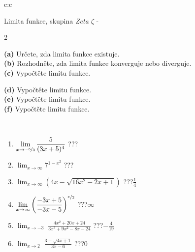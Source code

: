 \documentclass[10pt]{report}
\begin{document}
\newpage
\thispagestyle{empty}
\begin{tabular}{c:c}
\begin{minipage}[c][104.5mm][t]{0.5\linewidth}
\begin{center}
\vspace{7mm}
{\huge Limita funkce, skupina \textit{Zeta $\zeta$} -}\\[5mm]
\begin{minipage}{0.95\linewidth}
\begin{center}
{\small \begin{multicols}{2} \raggedright
\textbf{(a)} Určete, zda limita funkce existuje. \\[1mm]
\textbf{(b)} Rozhodněte, zda limita funkce konverguje nebo diverguje. \\[1mm]
\textbf{(c)} Vypočtěte limitu funkce. \par \columnbreak
\textbf{(d)} Vypočtěte limitu funkce. \\[1mm]
\textbf{(e)} Vypočtěte limitu funkce. \\[1mm]
\textbf{(f)} Vypočtěte limitu funkce. \\[1mm]
\end{multicols}
}
\end{center}
\end{minipage}
\\[4mm]
\begin{minipage}{0.79\linewidth}
\begin{center}
\begin{varwidth}{\linewidth}
\begin{enumerate}
\normalsize
\item $\displaystyle\lim_{x\to\nicefrac{-5}{3}}{\frac{5}{(3x+5)^{4}}}$\quad \dotfill\; ???\;\dotfill \quad {}
\item $\displaystyle\lim_{x\to\infty}{7^{1-x^2}}$\quad \dotfill\; ???\;\dotfill \quad {}
\item $\displaystyle\lim_{x\to\infty}{\left(4x - \sqrt{16x^2-2x+1}\right)}$\quad \dotfill\; ???\;\dotfill \quad $\frac{1}{4}$
\item $\displaystyle\lim_{x\to\infty}{\left( \frac{-3x+5}{-3x-5} \right)^{\nicefrac{x}{2}}}$\quad \dotfill\; ???\;\dotfill \quad $\infty$
\item $\displaystyle\lim_{x\to -3}{\;\frac{4x^2+20x+24}{3x^3+9x^2-8x-24}}$\quad \dotfill\; ???\;\dotfill \quad $-\frac{4}{19}$
\item $\displaystyle\lim_{x\to 2}{\;\frac{3-\sqrt{4x+1}}{3x-6}}$\quad \dotfill\; ???\;\dotfill \quad $0$

\end{enumerate}
\end{varwidth}
\end{center}
\end{minipage}
\end{center}
\end{minipage}
\end{tabular}
\end{document}
